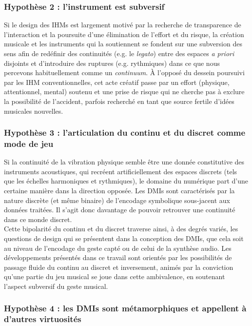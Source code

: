 \subsubsection*{Hypothèse 2 : l'instrument est subversif}

\noindent Si le design des \glspl{IHM} est largement motivé par la recherche de transparence de l'interaction et la poursuite d'une élimination de l'effort et du risque, la création musicale et les instruments qui la soutiennent se fondent sur une subversion des sens afin de redéfinir des continuités (e.g. le \textit{legato}) entre des espaces \textit{a priori} disjoints et d'introduire des ruptures (e.g. rythmiques) dans ce que nous percevons habituellement comme un \textit{continuum}. À l'opposé du dessein poursuivi par les \gls{IHM} conventionnelles, cet acte créatif passe par un effort (physique, attentionnel, mental) soutenu et une prise de risque qui ne cherche pas à exclure la possibilité de l'accident, parfois recherché en tant que source fertile d'idées musicales nouvelles.


\subsubsection*{Hypothèse 3 : l'articulation du continu et du discret comme mode de jeu}

\noindent Si la continuité de la vibration physique semble être une donnée constitutive des instruments acoustiques, qui recréent artificiellement des espaces discrets (tels que les échelles harmoniques et rythmiques), le domaine du numérique part d'une certaine manière dans la direction opposée. Les \glspl{DMI} sont caractérisés par la nature discrète (et même binaire) de l'encodage symbolique sous-jacent aux données traitées. Il s'agit donc davantage de pouvoir retrouver une continuité dans ce monde discret.\\
\indent Cette bipolarité du continu et du discret traverse ainsi, à des degrés variés, les questions de design qui se présentent dans la conception des \glspl{DMI}, que cela soit au niveau de l'encodage du geste capté ou de celui de la synthèse audio. Les développements présentés dans ce travail sont orientés par les possibilités de passage fluide du continu au discret et inversement, animés par la conviction qu'une partie du jeu musical se joue dans cette ambivalence, en soutenant l'aspect subversif du geste musical.

\subsubsection*{Hypothèse 4 : les DMIs sont métamorphiques et appellent à d'autres virtuosités}


